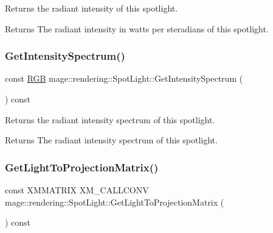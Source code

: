 Returns the radiant intensity of this spotlight.

\begin{DoxyReturn}{Returns}
The radiant intensity in watts per steradians of this spotlight. 
\end{DoxyReturn}
\mbox{\label{classmage_1_1rendering_1_1_spot_light_a049401f9c26b106acddfcb7ec09b0418}} 
\subsubsection{\texorpdfstring{Get\+Intensity\+Spectrum()}{GetIntensitySpectrum()}}
{\footnotesize\ttfamily const \mbox{\hyperlink{structmage_1_1_r_g_b}{R\+GB}} mage\+::rendering\+::\+Spot\+Light\+::\+Get\+Intensity\+Spectrum (\begin{DoxyParamCaption}{ }\end{DoxyParamCaption}) const\hspace{0.3cm}{\ttfamily [noexcept]}}

Returns the radiant intensity spectrum of this spotlight.

\begin{DoxyReturn}{Returns}
The radiant intensity spectrum of this spotlight. 
\end{DoxyReturn}
\mbox{\label{classmage_1_1rendering_1_1_spot_light_ad617d1c098e2ca222a9736b8c45fa0c8}} 
\subsubsection{\texorpdfstring{Get\+Light\+To\+Projection\+Matrix()}{GetLightToProjectionMatrix()}}
{\footnotesize\ttfamily const X\+M\+M\+A\+T\+R\+IX X\+M\+\_\+\+C\+A\+L\+L\+C\+O\+NV mage\+::rendering\+::\+Spot\+Light\+::\+Get\+Light\+To\+Projection\+Matrix (\begin{DoxyParamCaption}{ }\end{DoxyParamCaption}) const\hspace{0.3cm}{\ttfamily [noexcept]}}

